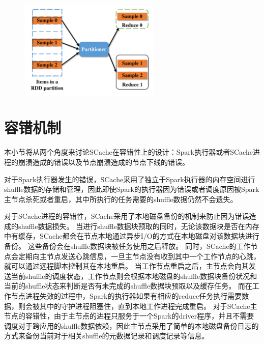\begin{figure}[!htp]
	\centering
	\includegraphics[width=0.6\textwidth]{../../PPoPP-2018/fig/sample.pdf}
\end{figure}

\section{容错机制}

本小节将从两个角度来讨论SCache在容错性上的设计：Spark执行器或者SCache进程的崩溃造成的错误以及节点崩溃造成的节点下线的错误。

对于Spark执行器发生的错误，SCache采用了独立于Spark执行器的内存空间进行shuffle数据的存储和管理，因此即使Spark的执行器因为错误或者调度原因被Spark主节点杀死或者重启，其中所执行的任务需要的shuffle数据仍然不会遗失。

对于SCache进程的容错性，SCache采用了本地磁盘备份的机制来防止因为错误造成的shuffle数据损失。
当进行shuffle数据块预取的同时，无论该数据块是否在内存中有缓存，SCache都会在节点本地通过异步I/O的方式在本地磁盘对该数据块进行备份。
这些备份会在shuffle数据块被任务使用之后释放。
同时，SCache的工作节点会定期向主节点发送心跳信息，一旦主节点没有收到其中一个工作节点的心跳，就可以通过远程脚本控制其在本地重启。
当工作节点重启之后，主节点会向其发送当前shuffle的调度状态，工作节点则会根据本地磁盘的shuffle数据块备份状况和当前的shuffle状态来判断是否有未完成的shuffle数据块预取以及缓存任务。
而在工作节点进程失效的过程中，Spark的执行器如果有相应的reduce任务执行需要数据，则会被其中的守护进程阻塞住，直到本地工作进程完成重启。
对于SCache主节点的容错性，由于主节点的进程只服务于一个Spark的driver程序，并且不需要调度对于跨应用的shuffle数据依赖，因此主节点采用了简单的本地磁盘备份日志的方式来备份当前对于相关shuffle的元数据记录和调度记录等信息。

